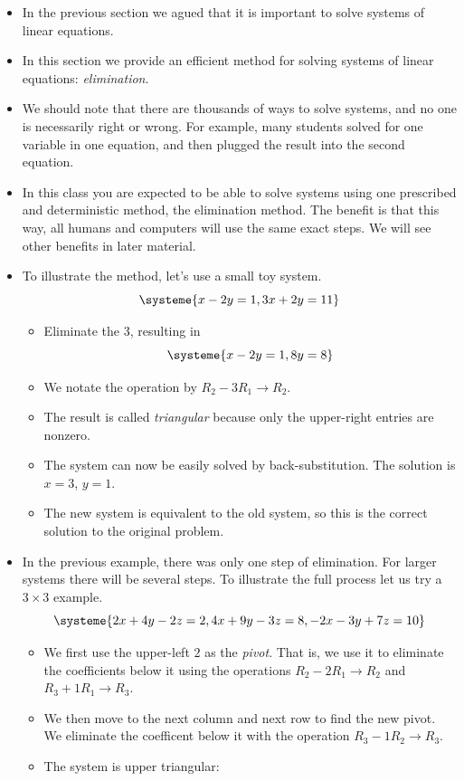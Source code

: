\documentclass[11pt,oneside]{amsbook}
\theoremstyle{definition}
\theoremstyle{plain}
\theoremstyle{definition}
\theoremstyle{remark}
\numberwithin{equation}{section}
\numberwithin{figure}{section}
\begin{document}
\begin{itemize}
\item In the previous section we agued that it is important to solve systems of linear equations.
\item In this section we provide an efficient method for solving systems of linear equations: \emph{elimination}.
\item We should note that there are thousands of ways to solve systems, and no one is necessarily right or wrong. For example, many students solved for one variable in one equation, and then plugged the result into the second equation.
\item In this class you are expected to be able to solve systems using one prescribed and deterministic method, the elimination method. The benefit is that this way, all humans and computers will use the same exact steps. We will see other benefits in later material.
\item To illustrate the method, let's use a small toy system.
  \[\systeme{x-2y=1,3x+2y=11}
  \]
  \begin{itemize}
  \item Eliminate the 3, resulting in
    \[\systeme{x-2y=1,8y=8}
    \]
  \item We notate the operation by $R_2-3R_1\to R_2$.
  \item The result is called \emph{triangular} because only the upper-right entries are nonzero.
  \item The system can now be easily solved by back-substitution. The solution is $x=3$, $y=1$.
  \item The new system is equivalent to the old system, so this is the correct solution to the original problem.
  \end{itemize}
\item In the previous example, there was only one step of elimination. For larger systems there will be several steps. To illustrate the full process let us try a $3\times3$ example.
  \[\systeme{2x+4y-2z=2,4x+9y-3z=8,-2x-3y+7z=10}
  \]
  \begin{itemize}
  \item We first use the upper-left $2$ as the \emph{pivot}. That is, we use it to eliminate the coefficients below it using the operations $R_2-2R_1\to R_2$ and $R_3+1R_1\to R_3$.
  \item We then move to the next column and next row to find the new pivot. We eliminate the coefficent below it with the operation $R_3-1R_2\to R_3$.
  \item The system is upper triangular:

\end{itemize}
\end{itemize}
\end{document}
